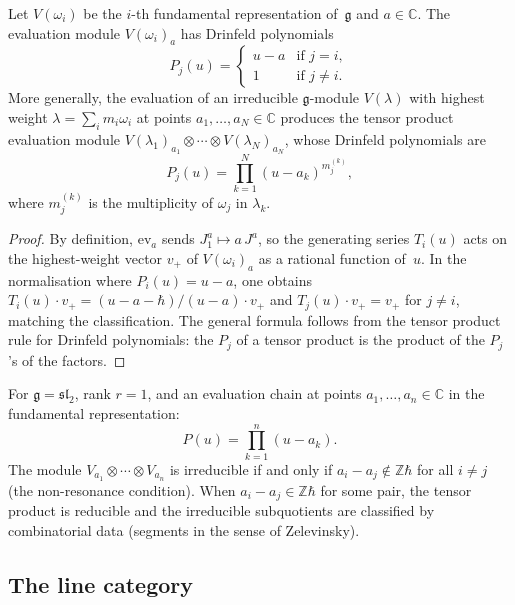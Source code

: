 \begin{proposition}
\label{prop:eval-drinfeld}
Let $V(\omega_i)$ be the $i$-th fundamental
representation of~$\mathfrak{g}$ and $a\in\mathbb{C}$.
The evaluation module $V(\omega_i)_a$ has Drinfeld
polynomials
\[
P_j(u)=
\begin{cases}
u-a & \text{if }j=i,\\
1 & \text{if }j\neq i.
\end{cases}
\]
More generally, the evaluation of an irreducible
$\mathfrak{g}$-module $V(\lambda)$ with highest weight
$\lambda=\sum_i m_i\omega_i$ at points
$a_1,\dots,a_N\in\mathbb{C}$ produces the tensor product
evaluation module $V(\lambda_1)_{a_1}\otimes\cdots\otimes
V(\lambda_N)_{a_N}$, whose Drinfeld polynomials are
\[
P_j(u)=\prod_{k=1}^N (u-a_k)^{m_j^{(k)}},
\]
where $m_j^{(k)}$ is the multiplicity of $\omega_j$ in
$\lambda_k$.
\end{proposition}

\begin{proof}
By definition, $\mathrm{ev}_a$ sends $J^a_1\mapsto a\,J^a$,
so the generating series $T_i(u)$ acts on the highest-weight
vector $v_+$ of $V(\omega_i)_a$ as a rational function of~$u$.
In the normalisation where $P_i(u)=u-a$, one obtains
$T_i(u)\cdot v_+=(u-a-\hbar)/(u-a)\cdot v_+$ and
$T_j(u)\cdot v_+=v_+$ for $j\neq i$, matching the
classification. The general formula follows from the
tensor product rule for Drinfeld polynomials: the
$P_j$ of a tensor product is the product of the
$P_j$'s of the factors.
\end{proof}

\begin{example}
\label{ex:drinfeld-eval-chain}
For $\mathfrak{g}=\mathfrak{sl}_2$, rank $r=1$, and an
evaluation chain at points $a_1,\dots,a_n\in\mathbb{C}$
in the fundamental representation:
\[
P(u)=\prod_{k=1}^n(u-a_k).
\]
The module $V_{a_1}\otimes\cdots\otimes V_{a_n}$ is
irreducible if and only if $a_i-a_j\notin\mathbb{Z}\hbar$
for all $i\neq j$ (the non-resonance condition).
When $a_i-a_j\in\mathbb{Z}\hbar$ for some pair, the tensor
product is reducible and the irreducible subquotients are
classified by combinatorial data (segments in the sense of
Zelevinsky).
\end{example}

\subsection{The line category}

